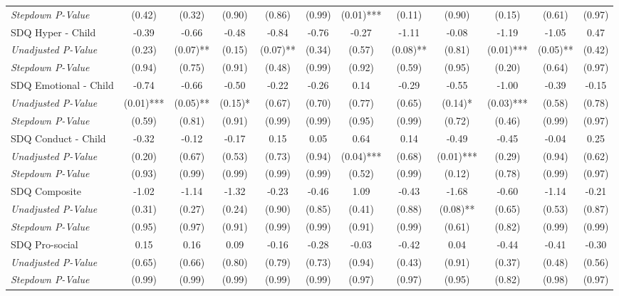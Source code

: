 \begin{tabular}{l c c c c c c c c c c c}
\quad \textit{Stepdown P-Value} & (0.42) & (0.32) & (0.90) & (0.86) & (0.99) & (0.01)*** & (0.11) & (0.90) & (0.15) & (0.61) & (0.97) \\
SDQ Hyper - Child & -0.39 & -0.66 & -0.48 & -0.84 & -0.76 & -0.27 & -1.11 & -0.08 & -1.19 & -1.05 & 0.47 \\
\quad \textit{Unadjusted P-Value} & (0.23) & (0.07)** & (0.15) & (0.07)** & (0.34) & (0.57) & (0.08)** & (0.81) & (0.01)*** & (0.05)** & (0.42) \\
\quad \textit{Stepdown P-Value} & (0.94) & (0.75) & (0.91) & (0.48) & (0.99) & (0.92) & (0.59) & (0.95) & (0.20) & (0.64) & (0.97) \\
SDQ Emotional - Child & -0.74 & -0.66 & -0.50 & -0.22 & -0.26 & 0.14 & -0.29 & -0.55 & -1.00 & -0.39 & -0.15 \\
\quad \textit{Unadjusted P-Value} & (0.01)*** & (0.05)** & (0.15)* & (0.67) & (0.70) & (0.77) & (0.65) & (0.14)* & (0.03)*** & (0.58) & (0.78) \\
\quad \textit{Stepdown P-Value} & (0.59) & (0.81) & (0.91) & (0.99) & (0.99) & (0.95) & (0.99) & (0.72) & (0.46) & (0.99) & (0.97) \\
SDQ Conduct - Child & -0.32 & -0.12 & -0.17 & 0.15 & 0.05 & 0.64 & 0.14 & -0.49 & -0.45 & -0.04 & 0.25 \\
\quad \textit{Unadjusted P-Value} & (0.20) & (0.67) & (0.53) & (0.73) & (0.94) & (0.04)*** & (0.68) & (0.01)*** & (0.29) & (0.94) & (0.62) \\
\quad \textit{Stepdown P-Value} & (0.93) & (0.99) & (0.99) & (0.99) & (0.99) & (0.52) & (0.99) & (0.12) & (0.78) & (0.99) & (0.97) \\
SDQ Composite & -1.02 & -1.14 & -1.32 & -0.23 & -0.46 & 1.09 & -0.43 & -1.68 & -0.60 & -1.14 & -0.21 \\
\quad \textit{Unadjusted P-Value} & (0.31) & (0.27) & (0.24) & (0.90) & (0.85) & (0.41) & (0.88) & (0.08)** & (0.65) & (0.53) & (0.87) \\
\quad \textit{Stepdown P-Value} & (0.95) & (0.97) & (0.91) & (0.99) & (0.99) & (0.91) & (0.99) & (0.61) & (0.82) & (0.99) & (0.99) \\
SDQ Pro-social & 0.15 & 0.16 & 0.09 & -0.16 & -0.28 & -0.03 & -0.42 & 0.04 & -0.44 & -0.41 & -0.30 \\
\quad \textit{Unadjusted P-Value} & (0.65) & (0.66) & (0.80) & (0.79) & (0.73) & (0.94) & (0.43) & (0.91) & (0.37) & (0.48) & (0.56) \\
\quad \textit{Stepdown P-Value} & (0.99) & (0.99) & (0.99) & (0.99) & (0.99) & (0.97) & (0.97) & (0.95) & (0.82) & (0.98) & (0.97) \\

\end{tabular}
